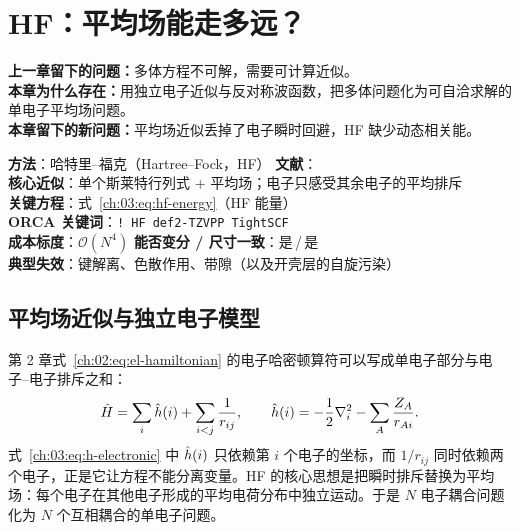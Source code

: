 
\section{HF：平均场能走多远？}
\label{ch:03:sec:title}

\begin{problemchain}
\textbf{上一章留下的问题：}多体方程不可解，需要可计算近似。\\
\textbf{本章为什么存在：}用独立电子近似与反对称波函数，把多体问题化为可自洽求解的单电子平均场问题。\\
\textbf{本章留下的新问题：}平均场近似丢掉了电子瞬时回避，HF 缺少动态相关能。
\end{problemchain}

\begin{methodcard}
\textbf{方法}：哈特里--福克（Hartree--Fock，HF）\quad
\textbf{文献}：\citep{szabo1996,helgaker2000}\\
\textbf{核心近似}：单个斯莱特行列式 + 平均场；电子只感受其余电子的平均排斥\\
\textbf{关键方程}：式~\eqref{ch:03:eq:hf-energy}（HF 能量）\\
\textbf{ORCA 关键词}：\texttt{! HF def2-TZVPP TightSCF}\\
\textbf{成本标度}：$\mathcal{O}(N^4)$ \quad
\textbf{能否变分 / 尺寸一致}：是\,/\,是\\
\textbf{典型失效}：键解离、色散作用、带隙（以及开壳层的自旋污染）
\end{methodcard}

\subsection{平均场近似与独立电子模型}
\label{ch:03:sec:mean-field}

第 2 章式~\eqref{ch:02:eq:el-hamiltonian} 的电子哈密顿算符可以写成单电子部分与电子--电子排斥之和：
\begin{equation}
\hat{H}
= \sum_i \hat{h}(i) + \sum_{i<j}\frac{1}{r_{ij}},
\qquad
\hat{h}(i)
= -\frac{1}{2}\nabla_i^2 - \sum_A \frac{Z_A}{r_{Ai}} .
\label{ch:03:eq:h-electronic}
\end{equation}
式~\eqref{ch:03:eq:h-electronic} 中 $\hat{h}(i)$ 只依赖第 $i$ 个电子的坐标，而 $1/r_{ij}$ 同时依赖两个电子，正是它让方程不能分离变量。HF 的核心思想是把瞬时排斥替换为平均场：每个电子在其他电子形成的平均电荷分布中独立运动。于是 $N$ 电子耦合问题化为 $N$ 个互相耦合的单电子问题。

